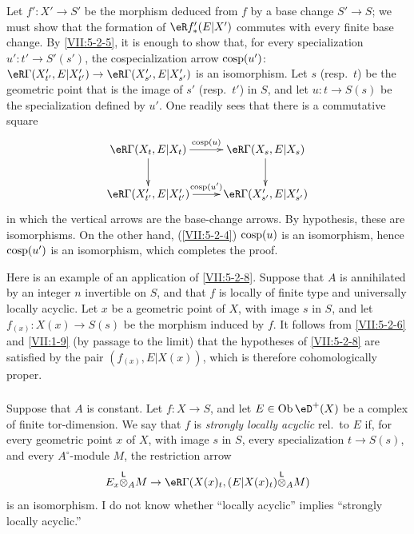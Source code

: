 Let $f':X'\to S'$ be the morphism deduced from $f$ by a base change
$S'\to S$; we must show that the formation of $\eR f'_\ast(E|X')$ commutes
with every finite base change. By \ref{VII:5-2-5}, it is enough to show that,
for every specialization $u':t'\to S'(s')$, the cospecialization arrow
$\operatorname{cosp}(u')$:
$\eR\Gamma(X_{t'}',E|X_{t'}') \to \eR\Gamma(X_{s'}',E|X_{s'}')$ is an
isomorphism. Let $s$ (resp.\ $t$) be the geometric point that is the image of
$s'$ (resp.\ $t'$) in $S$, and let $u:t\to S(s)$ be the
specialization defined by $u'$. One readily sees that there is a commutative
square
\[\xymatrix{
  \eR\Gamma(X_t,E|X_t) \ar[r]^-{\cosp(u)} \ar[d] 
    & \eR\Gamma(X_s,E|X_s) \ar[d] \\
  \eR\Gamma(X_{t'}',E|X_{t'}') \ar[r]^-{\cosp(u')} 
    & \eR\Gamma(X_{s'}',E|X_{s'}') 
}\]
in which the vertical arrows are the base-change arrows. By hypothesis, these
are isomorphisms. On the other hand, (\ref{VII:5-2-4}) $\operatorname{cosp}(u)$ is an
isomorphism, hence $\operatorname{cosp}(u')$ is an isomorphism, which completes the proof.

Here is an example of an application of \ref{VII:5-2-8}. Suppose that $A$ is
annihilated by an integer $n$ invertible on $S$, and that $f$ is locally of
finite type and universally locally acyclic. Let $x$ be a geometric point of
$X$, with image $s$ in $S$, and let $f_{(x)}:X(x)\to S(s)$ be the morphism
induced by $f$. It follows from \ref{VII:5-2-6} and \ref{VII:1-9} (by passage
to the limit) that the hypotheses of \ref{VII:5-2-8} are satisfied by the
pair $(f_{(x)},E|X(x))$, which is therefore cohomologically proper.






\subsubsection{}\label{VII:5-2-9}

Suppose that $A$ is constant. Let $f:X\to S$, and let $E\in\ob\eD^+(X)$ be a
complex of finite tor-dimension. We say that $f$ is \emph{strongly locally
acyclic} rel.\ to $E$ if, for every geometric point $x$ of $X$, with image
$s$ in $S$, every specialization $t\to S(s)$, and every $A^\circ$-module $M$,
the restriction arrow
\[
  E_x\lotimes_A M \to \eR\Gamma(X(x)_t,(E|X(x)_t)\lotimes_A M) 
\]
is an isomorphism. I do not know whether ``locally acyclic'' implies
``strongly locally acyclic.''






